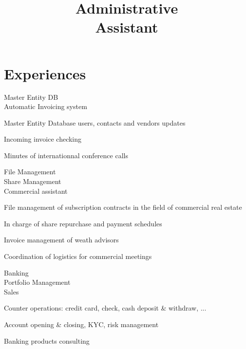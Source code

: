 \documentclass[a4paper,11pt]{cv4tw}%
\title{Administrative\\Assistant}
\begin{document}



	\section{Experiences}

	{Master Entity DB\\Automatic Invoicing system}
		{
		\begin{missions}
			\item Master Entity Database users, contacts and vendors updates
			\item Incoming invoice checking
			\item Minutes of internationnal conference calls
		\end{missions}
	}

	{File Management\\Share Management\\Commercial assistant}
		{ 
		\begin{missions}
			\item File management of subscription contracts in the field of commercial real estate
			\item In charge of share repurchase and payment schedules
			\item Invoice management of weath advisors
			\item Coordination of logistics for commercial meetings
		\end{missions}
	}

	{Banking\\Portfolio Management\\Sales}
		{ 
		\begin{missions}
			\item Counter operations: credit card, check, cash deposit \& withdraw, ...
			\item Account opening \& closing, KYC, risk management
			\item Banking products consulting
		\end{missions}
	}
\end{document}

